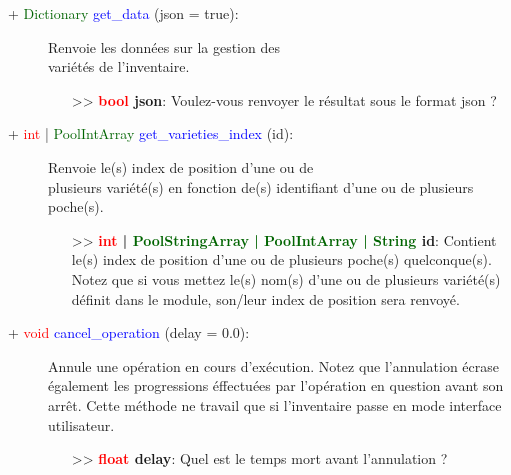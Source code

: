 \documentclass[a4paper, 11pt]{article}
\begin{document}
	\begin{description}
		\item [+ \textcolor{darkgreen}{Dictionary} \textcolor{blue}{get\_data} (json = true):] Renvoie les 
		données sur la gestion des \\variétés de l'inventaire.
		\begin{itemize}
			\item [>> \textbf{\textcolor{red}{bool} json}:] Voulez-vous renvoyer le résultat sous le format 
			json ?\\
		\end{itemize}
	\end{description}
	\begin{description}
		\item [+ \textcolor{red}{int} | \textcolor{darkgreen}{PoolIntArray} \textcolor{blue}
		{get\_varieties\_index} (id):] Renvoie le(s) index de position d'une ou de \\plusieurs variété(s) en 
		fonction de(s) identifiant d'une ou de plusieurs poche(s).
		\begin{itemize}
			\item[>> \textbf{\textcolor{red}{int} | \textcolor{darkgreen}{PoolStringArray | PoolIntArray | 
			String} id}:] Contient le(s) index de position d'une ou de plusieurs poche(s) quelconque(s). 
			Notez que si vous mettez le(s) nom(s) d'une ou de plusieurs variété(s) définit dans le module, 
			son/leur index de position sera renvoyé.\\
		\end{itemize}
	\end{description}
	\begin{description}
		\item [+ \textcolor{red}{void} \textcolor{blue}{cancel\_operation} (delay = 0.0):] Annule une 
		opération en cours d'exécution. Notez que l'annulation écrase également les progressions éffectuées
		par l'opération en question avant son arrêt. Cette méthode ne travail que si l'inventaire passe en 
		mode interface utilisateur.
		\begin{itemize}
			\item [>> \textbf{\textcolor{red}{float} delay}:] Quel est le temps mort avant l'annulation ?\\
		\end{itemize}
	\end{description}
\end{document}
